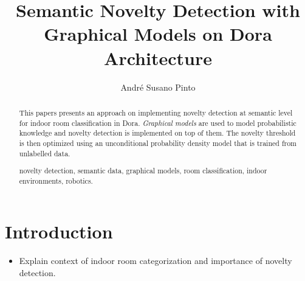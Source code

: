 \documentclass[runningheads,a4paper]{llncs}
\newcommand{\keywords}[1]{\par\addvspace\baselineskip
\noindent\keywordname\enspace\ignorespaces#1}
\begin{document}
\mainmatter  %

\title{Semantic Novelty Detection with Graphical Models
on Dora Architecture}


%
%
\author{André Susano Pinto}
%


\maketitle


\begin{abstract}
This papers presents an approach on implementing novelty detection at semantic level
for indoor room classification in Dora. \emph{Graphical models} are used to model
probabilistic knowledge and novelty detection is implemented on top of them.
The novelty threshold is then optimized using an unconditional probability density
model that is trained from unlabelled data.

\keywords{novelty detection, semantic data, graphical models, room classification,
indoor environments, robotics.}
\end{abstract}


\section{Introduction}
\begin{itemize}
\item Explain context of indoor room categorization and importance of novelty detection.
\end{itemize}
\end{document}
